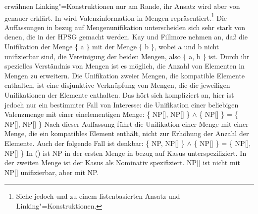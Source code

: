 \mbox{}\citet[]{KF99a}  erwähnen Linking"=Konstruktionen nur am Rande, ihr Ansatz wird aber
von \citet[Kapitel~4]{MR2001a} genauer erklärt. In  wird Valenzinformation
in Mengen repräsentiert.\footnote{
  Siehe jedoch  und  zu einem listenbasierten Ansatz und
  Linking"=Konstruktionen.
}
Die Auffassungen in bezug auf Mengenunifikation unterscheiden sich sehr
stark von denen, die in der HPSG gemacht werden. Kay und Fillmore nehmen an, daß
die Unifikation der Menge \{ a \} mit der Menge \{ b \}, wobei a und b nicht unifizierbar sind,
die Vereinigung der beiden Mengen, also \{ a, b \} ist.
Durch ihr spezielles Verständnis von Mengen ist es möglich, die Anzahl von Elementen in Mengen
zu erweitern. Die Unifikation zweier Mengen, die kompatible Elemente enthalten, ist eine disjunktive
Verknüpfung von Mengen, die die jeweiligen Unifikationen der Elemente enthalten. Das hört sich kompliziert
an, hier ist jedoch nur ein bestimmter Fall von Interesse: die Unifikation einer beliebigen
Valenzmenge mit einer einelementigen Menge:
\ea
\{ NP[\nom], NP[\acc] \} $\wedge$ \{ NP[\nom] \} = \{ NP[\nom], NP[\acc] \}
\z
Nach dieser Auffassung führt die Unifikation einer Menge mit einer Menge, die ein kompatibles
Element enthält, nicht zur Erhöhung der Anzahl der Elemente. Auch der folgende Fall ist denkbar:
\ea
\{ NP, NP[\acc] \} $\wedge$ \{ NP[\nom] \} = \{ NP[\nom], NP[\acc] \}
\z
In () ist NP in der ersten Menge in bezug auf Kasus unterspezifiziert. In der zweiten Menge
ist der Kasus als Nominativ spezifiziert. NP[\nom] ist nicht mit  NP[\acc] unifizierbar, aber mit NP.

